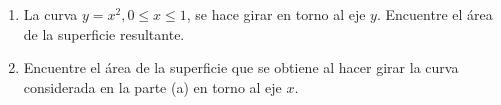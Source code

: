 \item 
    \begin{enumerate}
        \item[(a)] La curva $y = x^2, 0 \le x \le 1$, se hace girar en torno al eje $y$. Encuentre el área de la superficie resultante.
        \item[(b)] Encuentre el área de la superficie que se obtiene al hacer girar la curva considerada en la parte (a) en torno al eje $x$.
    \end{enumerate}
